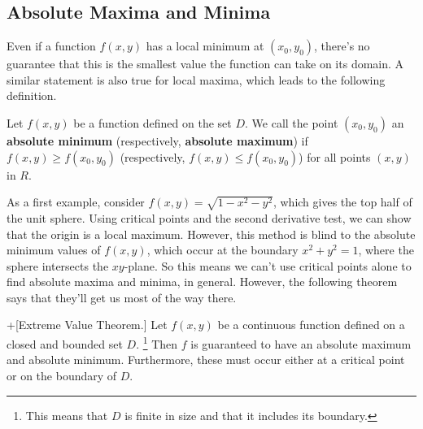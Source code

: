 \documentclass[10pt,]{book}
\newcommand{\terminology}[1]{\textbf{#1}}
\theoremstyle{ptxplainnotitle}
\theoremstyle{ptxplaintitle}
\theoremstyle{ptxplainnotitle}
\theoremstyle{ptxplaintitle}
\theoremstyle{ptxplainnotitle}
\theoremstyle{ptxplaintitle}
\theoremstyle{ptxdefinitionnotitle}
\theoremstyle{ptxdefinitiontitle}
\theoremstyle{ptxdefinitionnotitle}
\theoremstyle{ptxdefinitiontitle}
\theoremstyle{ptxdefinitionnotitle}
\theoremstyle{ptxdefinitiontitle}
\theoremstyle{ptxdefinitionnotitle}
\theoremstyle{ptxdefinitiontitle}
\theoremstyle{ptxdefinitionnotitle}
\theoremstyle{ptxdefinitiontitle}
\numberwithin{equation}{section}
\begin{document}
\subsection[{Absolute Maxima and Minima}]{Absolute Maxima and Minima}\label{subsection-absolute-maxima-and-minima}
\hypertarget{p-1085}{}%
Even if a function \(f(x,y)\) has a local minimum at \((x_{0},y_{0})\), there's no guarantee that this is the smallest value the function can take on its domain. A similar statement is also true for local maxima, which leads to the following definition.%
\begin{definition}\label{definition-absolute-maxima-and-minima}
\hypertarget{p-1086}{}%
Let \(f(x,y)\) be a function defined on the set \(D\). We call the point \((x_{0},y_{0})\) an \terminology{absolute minimum} (respectively, \terminology{absolute maximum}) if \(f(x,y)\geq f(x_{0},y_{0})\) (respectively, \(f(x,y)\leq f(x_{0},y_{0})\)) for all points \((x,y)\) in \(R\).%
\end{definition}
\hypertarget{p-1087}{}%
As a first example, consider \(f(x,y) = \sqrt{1 - x^{2} - y^{2}}\), which gives the top half of the unit sphere. Using critical points and the second derivative test, we can show that the origin is a local maximum. However, this method is blind to the absolute minimum values of \(f(x,y)\), which occur at the boundary \(x^{2} + y^{2} = 1\), where the sphere intersects the \(xy\)-plane. So this means we can't use critical points alone to find absolute maxima and minima, in general. However, the following theorem says that they'll get us most of the way there.%
\begin{theorem}+[{Extreme Value Theorem.}]\label{theorem-extreme-value-theorem}
\hypertarget{p-1088}{}%
Let \(f(x,y)\) be a continuous function defined on a closed and bounded set \(D\). \footnote{This means that \(D\) is finite in size and that it includes its boundary.\label{fn-7}} Then \(f\) is guaranteed to have an absolute maximum and absolute minimum. Furthermore, these must occur either at a critical point or on the boundary of \(D\).%
\end{theorem}
\end{document}
